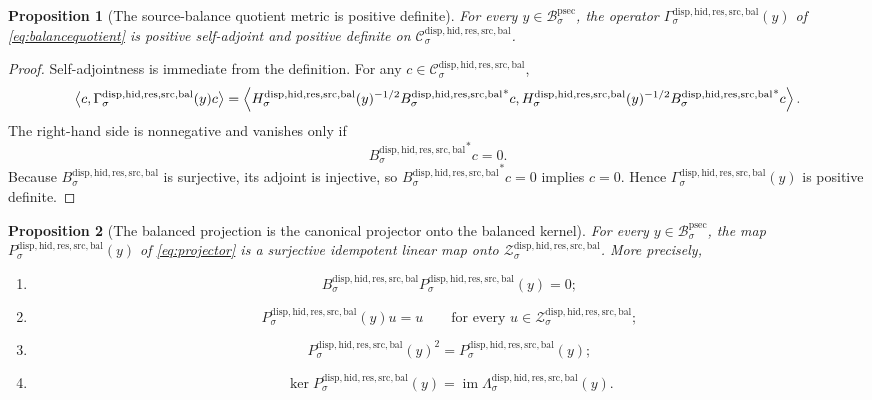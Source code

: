 \documentclass[11pt]{article}
\newcommand{\ProtoSectionBody}[1]{\mathcal B_{#1}^{\mathrm{psec}}}
\newcommand{\SourceBalanceTarget}[1]{\mathcal C_{#1}^{\mathrm{disp,hid,res,src,bal}}}
\newcommand{\SourceBalanceOperator}[1]{B_{#1}^{\mathrm{disp,hid,res,src,bal}}}
\newcommand{\SourceBalancedState}[1]{\mathcal Z_{#1}^{\mathrm{disp,hid,res,src,bal}}}
\newcommand{\SourceBalanceResponse}[1]{H_{#1}^{\mathrm{disp,hid,res,src,bal}}}
\newcommand{\SourceBalanceQuotientMetric}[1]{\Gamma_{#1}^{\mathrm{disp,hid,res,src,bal}}}
\newcommand{\SourceBalanceCorrector}[1]{\Lambda_{#1}^{\mathrm{disp,hid,res,src,bal}}}
\newcommand{\BalancedProjection}[1]{P_{#1}^{\mathrm{disp,hid,res,src,bal}}}
\newtheorem{proposition}{Proposition}
\begin{document}
\begin{proposition}[The source-balance quotient metric is positive definite]
\label{prop:balancequotient}
For every \(y\in\ProtoSectionBody{\sigma}\), the operator \(\SourceBalanceQuotientMetric{\sigma}(y)\) of \eqref{eq:balancequotient} is positive self-adjoint and positive definite on \(\SourceBalanceTarget{\sigma}\).
\end{proposition}

\begin{proof}
Self-adjointness is immediate from the definition. For any \(c\in\SourceBalanceTarget{\sigma}\),
\[
\ev{
c,\SourceBalanceQuotientMetric{\sigma}(y)c
}
=
\ev{
\SourceBalanceResponse{\sigma}(y)^{-1/2}
{\SourceBalanceOperator{\sigma}}^{*}c,
\SourceBalanceResponse{\sigma}(y)^{-1/2}
{\SourceBalanceOperator{\sigma}}^{*}c
}.
\]
The right-hand side is nonnegative and vanishes only if
\[
{\SourceBalanceOperator{\sigma}}^{*}c=0.
\]
Because \(\SourceBalanceOperator{\sigma}\) is surjective, its adjoint is injective, so \({\SourceBalanceOperator{\sigma}}^{*}c=0\) implies \(c=0\). Hence \(\SourceBalanceQuotientMetric{\sigma}(y)\) is positive definite.
\end{proof}

\begin{proposition}[The balanced projection is the canonical projector onto the balanced kernel]
\label{prop:projector}
For every \(y\in\ProtoSectionBody{\sigma}\), the map \(\BalancedProjection{\sigma}(y)\) of \eqref{eq:projector} is a surjective idempotent linear map onto \(\SourceBalancedState{\sigma}\). More precisely,
\begin{enumerate}
    \item
    \[
    \SourceBalanceOperator{\sigma}\BalancedProjection{\sigma}(y)=0;
    \]
    \item
    \[
    \BalancedProjection{\sigma}(y)u=u
    \qquad
    \text{for every }
    u\in\SourceBalancedState{\sigma};
    \]
    \item
    \[
    \BalancedProjection{\sigma}(y)^{2}
    =
    \BalancedProjection{\sigma}(y);
    \]
    \item
    \[
    \ker \BalancedProjection{\sigma}(y)
    =
    \operatorname{im}\SourceBalanceCorrector{\sigma}(y).
    \]
\end{enumerate}
\end{proposition}
\end{document}
